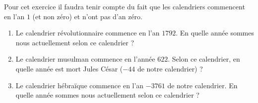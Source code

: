 
\begin{exercice}\label{exo2smath-0042}

    Pour cet exercice il faudra tenir compte du fait que les calendriers commencent en l'an \( 1\) (et non zéro) et n'ont pas d'an zéro.
    \begin{enumerate}
        \item
            Le calendrier révolutionnaire commence en l'an \( 1792\). En quelle année sommes nous actuellement selon ce calendrier ?
        \item
            Le calendrier musulman commence en l'année \( 622\). Selon ce calendrier, en quelle année est mort Jules César (\( -44\) de notre calendrier) ?
        \item
            Le calendrier hébraïque commence en l'an \( -3761\) de notre calendrier. En quelle année sommes nous actuellement selon ce calendrier ?
    \end{enumerate}

\end{exercice}
